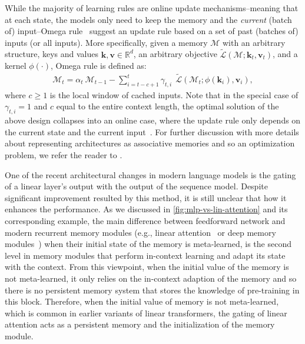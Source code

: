 \documentclass{article}
\newcommand{\vv}{\mathbf{v}}
\newcommand{\citep}{\parencite}
\newcommand{\citet}{\textcite}
\newcommand{\R}[0]{\mathbb{R}}
\newcommand{\M}[0]{\mathcal{M}}
\newcommand{\head}[1]{\vspace{1.7mm}\noindent{{\textcolor{c4}{\bf #1.}}}}
\newcommand{\vk}{\boldsymbol{k}}
\renewcommand{\vv}{\boldsymbol{v}}
\begin{document}
{While the majority of learning rules are online update mechanisms–meaning that at each state, the models only need to keep the memory and the \emph{current} (batch of) input–Omega rule~\citep{behrouz2025atlas} suggest an update rule based on a set of past (batches of) inputs (or all inputs). More specifically, given a memory $\M$ with an arbitrary structure, keys and values $\vk, \vv \in \R^{d}$, an arbitrary objective $\tilde{\mathcal{L}}(\M; \vk_t, \vv_t)$, and a kernel $\phi(\cdot)$, Omega rule is defined as:
\begin{align}
    \M_{t} = \alpha_t \: \M_{t-1} - \sum_{i = t-c+1}^{t} \gamma_{t, i} \:\:\tilde{\mathcal{L}}(\M_t; \phi(\vk_i), \vv_i),
\end{align}
where $c \geq 1$ is the local window of cached inputs. Note that in the special case of $\gamma_{t, i} = 1$ and $c$ equal to the entire context length, the optimal solution of the above design collapses into an online case, where the update rule only depends on the current state and the current input~\citep{von2023uncovering}. For further discussion with more details about representing architectures as associative memories and so an optimization problem, we refer the reader to \citet{behrouz2025Miras}.  

\head{A Note on Gating in Modern Sequence Models}
One of the recent architectural changes in modern language models is the gating of a linear layer's output with the output of the sequence model. Despite significant improvement resulted by this method, it is still unclear that how it enhances the performance. 
As we discussed in \autoref{fig:mlp-vs-lin-attention} and its corresponding example, the main difference between feedforward network and modern recurrent memory modules (e.g., linear attention~\citep{katharopoulos2020transformers} or deep memory modules~\citep{behrouz2024titans}) when their initial state of the memory is meta-learned, is the second level in memory modules that perform in-context learning and adapt its state with the context. From this viewpoint, when the initial value of the memory is not meta-learned, it only relies on the in-context adaption of the memory and so there is no persistent memory system that stores the knowledge of pre-training in this block. Therefore, when the initial value of memory is not meta-learned, which is common in earlier variants of linear transformers, the gating of linear attention acts as a persistent memory and the initialization of the memory module. 

}
\end{document}
